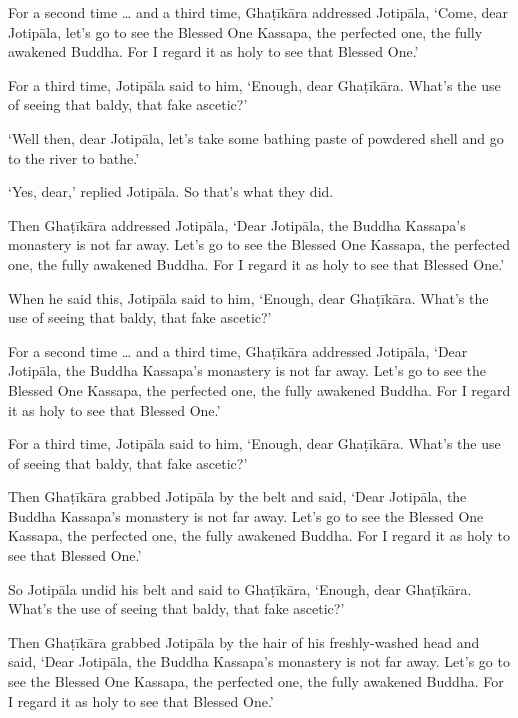 \documentclass[12pt,openany]{book}%
\begin{document}
For a second time … and a third time, \textsanskrit{Ghaṭīkāra} addressed \textsanskrit{Jotipāla}, ‘Come, dear \textsanskrit{Jotipāla}, let’s go to see the Blessed One Kassapa, the perfected one, the fully awakened Buddha. For I regard it as holy to see that Blessed One.’ 

For a third time, \textsanskrit{Jotipāla} said to him, ‘Enough, dear \textsanskrit{Ghaṭīkāra}. What’s the use of seeing that baldy, that fake ascetic?’ 

‘Well then, dear \textsanskrit{Jotipāla}, let’s take some bathing paste of powdered shell and go to the river to bathe.’ 

‘Yes, dear,’ replied \textsanskrit{Jotipāla}. So that’s what they did. 

Then \textsanskrit{Ghaṭīkāra} addressed \textsanskrit{Jotipāla}, ‘Dear \textsanskrit{Jotipāla}, the Buddha Kassapa’s monastery is not far away. Let’s go to see the Blessed One Kassapa, the perfected one, the fully awakened Buddha. For I regard it as holy to see that Blessed One.’ 

When he said this, \textsanskrit{Jotipāla} said to him, ‘Enough, dear \textsanskrit{Ghaṭīkāra}. What’s the use of seeing that baldy, that fake ascetic?’ 

For a second time … and a third time, \textsanskrit{Ghaṭīkāra} addressed \textsanskrit{Jotipāla}, ‘Dear \textsanskrit{Jotipāla}, the Buddha Kassapa’s monastery is not far away. Let’s go to see the Blessed One Kassapa, the perfected one, the fully awakened Buddha. For I regard it as holy to see that Blessed One.’ 

For a third time, \textsanskrit{Jotipāla} said to him, ‘Enough, dear \textsanskrit{Ghaṭīkāra}. What’s the use of seeing that baldy, that fake ascetic?’ 

Then \textsanskrit{Ghaṭīkāra} grabbed \textsanskrit{Jotipāla} by the belt and said, ‘Dear \textsanskrit{Jotipāla}, the Buddha Kassapa’s monastery is not far away. Let’s go to see the Blessed One Kassapa, the perfected one, the fully awakened Buddha. For I regard it as holy to see that Blessed One.’ 

So \textsanskrit{Jotipāla} undid his belt and said to \textsanskrit{Ghaṭīkāra}, ‘Enough, dear \textsanskrit{Ghaṭīkāra}. What’s the use of seeing that baldy, that fake ascetic?’ 

Then \textsanskrit{Ghaṭīkāra} grabbed \textsanskrit{Jotipāla} by the hair of his freshly-washed head and said, ‘Dear \textsanskrit{Jotipāla}, the Buddha Kassapa’s monastery is not far away. Let’s go to see the Blessed One Kassapa, the perfected one, the fully awakened Buddha. For I regard it as holy to see that Blessed One.’ 
\end{document}

